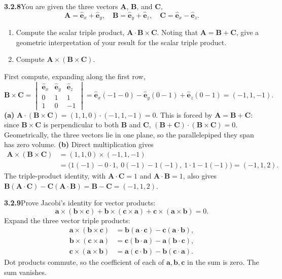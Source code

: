 \par\bigskip
\noindent\textbf{3.2.8}\quad You are given the three vectors $\mathbf{A}$,
$\mathbf{B}$, and $\mathbf{C}$,
\[
\mathbf{A}=\hat{\mathbf{e}}_{x}+\hat{\mathbf{e}}_{y},\quad
\mathbf{B}=\hat{\mathbf{e}}_{y}+\hat{\mathbf{e}}_{z},\quad
\mathbf{C}=\hat{\mathbf{e}}_{x}-\hat{\mathbf{e}}_{z}.
\]
\begin{enumerate}
\item[(a)] Compute the scalar triple product,
  $\mathbf{A}\cdot\mathbf{B}\times\mathbf{C}$. Noting that
  $\mathbf{A}=\mathbf{B}+\mathbf{C}$, give a geometric interpretation of your
  result for the scalar triple product.
\item[(b)] Compute $\mathbf{A}\times(\mathbf{B}\times\mathbf{C})$.
\end{enumerate}
\solution
First compute, expanding along the first row,
\[
\mathbf B\times\mathbf C
=\begin{vmatrix}\hat{\mathbf e}_x&\hat{\mathbf e}_y&\hat{\mathbf e}_z\\
0&1&1\\1&0&-1\end{vmatrix}
=\hat{\mathbf e}_x(-1-0)-\hat{\mathbf e}_y(0-1)+\hat{\mathbf e}_z(0-1)
=(-1,1,-1).
\]
\textbf{(a)} $\mathbf A\cdot(\mathbf B\times\mathbf C)
=(1,1,0)\cdot(-1,1,-1)=\boxed{0}$.
This is forced by $\mathbf A=\mathbf B+\mathbf C$: since
$\mathbf B\times\mathbf C$ is perpendicular to both $\mathbf B$ and
$\mathbf C$, $(\mathbf B+\mathbf C)\cdot(\mathbf B\times\mathbf C)=0$.
Geometrically, the three vectors lie in one plane, so the
parallelepiped they span has zero volume.
\textbf{(b)} Direct multiplication gives
\[
\begin{aligned}
\mathbf A\times(\mathbf B\times\mathbf C)
&=(1,1,0)\times(-1,1,-1)\\
&=\bigl(1(-1)-0\cdot1,\ 0(-1)-1(-1),\ 1\cdot1-1(-1)\bigr)
=\boxed{(-1,1,2)}.
\end{aligned}
\]
The triple-product identity, with $\mathbf A\cdot\mathbf C=1$ and
$\mathbf A\cdot\mathbf B=1$, also gives
$\mathbf B(\mathbf A\cdot\mathbf C)-\mathbf C(\mathbf A\cdot\mathbf B)
=\mathbf B-\mathbf C=(-1,1,2)$.

\par\bigskip
\noindent\textbf{3.2.9}\quad Prove Jacobi's identity for vector products:
\[
\mathbf{a}\times(\mathbf{b}\times\mathbf{c})
+\mathbf{b}\times(\mathbf{c}\times\mathbf{a})
+\mathbf{c}\times(\mathbf{a}\times\mathbf{b})=0.
\]
\solution
Expand the three vector triple products:
\[
\begin{aligned}
\mathbf a\times(\mathbf b\times\mathbf c)
&=\mathbf b(\mathbf a\cdot\mathbf c)-\mathbf c(\mathbf a\cdot\mathbf b),\\
\mathbf b\times(\mathbf c\times\mathbf a)
&=\mathbf c(\mathbf b\cdot\mathbf a)-\mathbf a(\mathbf b\cdot\mathbf c),\\
\mathbf c\times(\mathbf a\times\mathbf b)
&=\mathbf a(\mathbf c\cdot\mathbf b)-\mathbf b(\mathbf c\cdot\mathbf a).
\end{aligned}
\]
Dot products commute, so the coefficient of each of
$\mathbf a,\mathbf b,\mathbf c$ in the sum is zero. The sum vanishes.


